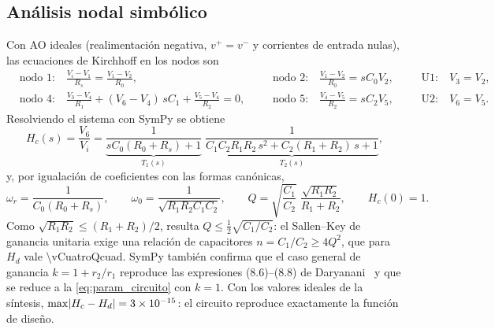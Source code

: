 \subsection{Análisis nodal simbólico}
Con AO ideales (realimentación negativa, $v^+ = v^-$ y corrientes de entrada nulas), las ecuaciones de Kirchhoff en los nodos son
\begin{equation}
\begin{aligned}
  &\text{nodo 1:}\quad \frac{V_i-V_1}{R_s} = \frac{V_1-V_2}{R_0}, &\qquad
  &\text{nodo 2:}\quad \frac{V_1-V_2}{R_0} = sC_0V_2, &\qquad
  &\text{U1:}\quad V_3 = V_2,\\
  &\text{nodo 4:}\quad \frac{V_3-V_4}{R_1} + (V_6-V_4)\,sC_1 + \frac{V_5-V_4}{R_2} = 0, &
  &\text{nodo 5:}\quad \frac{V_4-V_5}{R_2} = sC_2V_5, &
  &\text{U2:}\quad V_6 = V_5.
\end{aligned}
\label{eq:nodales}
\end{equation}
Resolviendo el sistema con SymPy se obtiene
\begin{equation}
  H_c(s) = \frac{V_6}{V_i} =
  \underbrace{\frac{1}{sC_0(R_0+R_s)+1}}_{T_1(s)}\;
  \underbrace{\frac{1}{C_1C_2R_1R_2\,s^2 + C_2(R_1+R_2)\,s + 1}}_{T_2(s)},
  \label{eq:Hc}
\end{equation}
y, por igualación de coeficientes con las formas canónicas,
\begin{equation}
  \omega_r = \frac{1}{C_0(R_0+R_s)},\qquad
  \omega_0 = \frac{1}{\sqrt{R_1R_2C_1C_2}},\qquad
  Q = \sqrt{\frac{C_1}{C_2}}\;\frac{\sqrt{R_1R_2}}{R_1+R_2},\qquad H_c(0) = 1.
  \label{eq:param_circuito}
\end{equation}
Como $\sqrt{R_1R_2} \le (R_1+R_2)/2$, resulta $Q \le \tfrac12\sqrt{C_1/C_2}$: el Sallen--Key de ganancia unitaria exige una relación de
capacitores $n = C_1/C_2 \ge 4Q^2$, que para $H_d$ vale \num{\vCuatroQcuad}. SymPy también confirma que el caso general de ganancia
$k = 1 + r_2/r_1$ reproduce las expresiones (8.6)--(8.8) de Daryanani~\cite{daryanani1976} y que se reduce a la \cref{eq:param_circuito} con
$k = 1$. Con los valores ideales de la síntesis, $\max\lvert H_c - H_d\rvert = \num{3e-15}$: el circuito reproduce exactamente la función
de diseño.

